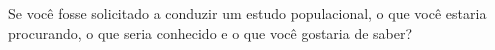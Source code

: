 Se você fosse solicitado a conduzir um estudo populacional, o que você estaria procurando, o que seria conhecido e o que você gostaria de saber?
